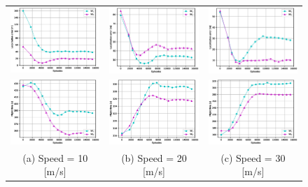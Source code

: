 \documentclass[journal,twocolumn]{IEEEtran}
\begin{document}
{\begin{figure}[t]
\begin{tabular}{ccc}
\includegraphics[width=2in]{Figures/10_w_2.eps} &
\includegraphics[width=2in]{Figures/20_w_2.eps} &
\includegraphics[width=2in]{Figures/30_w_2.eps}\\

\includegraphics[width=2in]{Figures/10_w_3.eps} &
\includegraphics[width=2in]{Figures/20_w_3.eps} &
\includegraphics[width=2in]{Figures/30_w_3.eps}\\
(a) Speed = 10 [m/s]  & (b) Speed = 20 [m/s] & (c) Speed = 30 [m/s] \\


\end{tabular}
\end{figure}}
\end{document}
